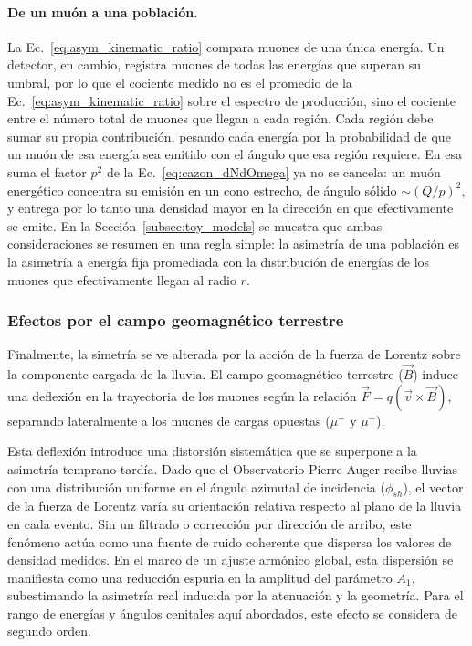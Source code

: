 \paragraph{De un muón a una población.} La Ec.~\ref{eq:asym_kinematic_ratio} compara muones de una única energía. Un detector, en cambio, registra muones de todas las energías que superan su umbral, por lo que el cociente medido no es el promedio de la Ec.~\ref{eq:asym_kinematic_ratio} sobre el espectro de producción, sino el cociente entre el número total de muones que llegan a cada región. Cada región debe sumar su propia contribución, pesando cada energía por la probabilidad de que un muón de esa energía sea emitido con el ángulo que esa región requiere. En esa suma el factor $p^2$ de la Ec.~\ref{eq:cazon_dNdOmega} ya no se cancela: un muón energético concentra su emisión en un cono estrecho, de ángulo sólido $\sim(Q/p)^2$, y entrega por lo tanto una densidad mayor en la dirección en que efectivamente se emite. En la Sección~\ref{subsec:toy_models} se muestra que ambas consideraciones se resumen en una regla simple: la asimetría de una población es la asimetría a energía fija promediada con la distribución de energías de los muones que efectivamente llegan al radio $r$.

\subsubsection{Efectos por el campo geomagnético terrestre}
\label{subsubsec:geomagnetico}

Finalmente, la simetría se ve alterada por la acción de la fuerza de Lorentz sobre la componente cargada de la lluvia. El campo geomagnético terrestre ($\vec{B}$) induce una deflexión en la trayectoria de los muones según la relación $\vec{F} = q(\vec{v} \times \vec{B})$, separando lateralmente a los muones de cargas opuestas ($\mu^+$ y $\mu^-$).

Esta deflexión introduce una distorsión sistemática que se superpone a la asimetría temprano-tardía. Dado que el Observatorio Pierre Auger recibe lluvias con una distribución uniforme en el ángulo azimutal de incidencia ($\phi_{sh}$), el vector de la fuerza de Lorentz varía su orientación relativa respecto al plano de la lluvia en cada evento. Sin un filtrado o corrección por dirección de arribo, este fenómeno actúa como una fuente de ruido coherente que dispersa los valores de densidad medidos. En el marco de un ajuste armónico global, esta dispersión se manifiesta como una reducción espuria en la amplitud del parámetro $A_1$, subestimando la asimetría real inducida por la atenuación y la geometría. Para el rango de energías y ángulos cenitales aquí abordados, este efecto se considera de segundo orden.

